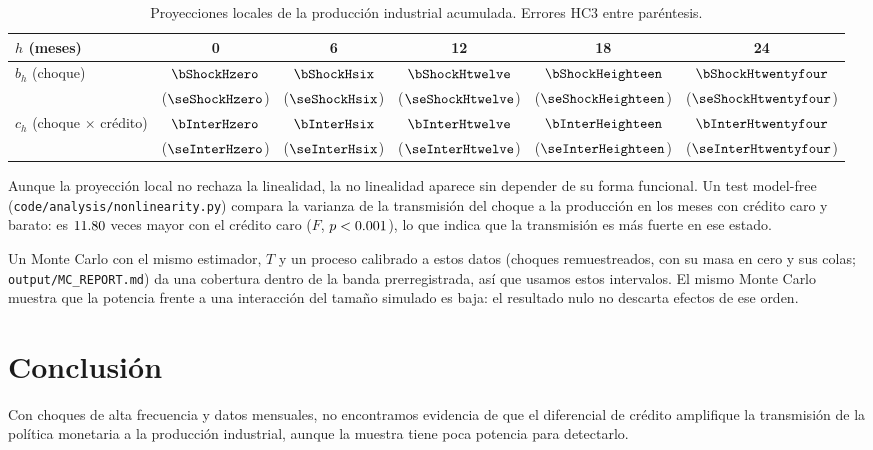 \documentclass[11pt]{article}
\begin{document}
\begin{table}[h]
\centering
\begin{tabular}{lccccc}
\toprule
$h$ (meses) & 0 & 6 & 12 & 18 & 24 \\
\midrule
$b_h$ (choque) & $\bShockHzero$ & $\bShockHsix$ & $\bShockHtwelve$ & $\bShockHeighteen$ & $\bShockHtwentyfour$ \\
 & ($\seShockHzero$) & ($\seShockHsix$) & ($\seShockHtwelve$) & ($\seShockHeighteen$) & ($\seShockHtwentyfour$) \\
$c_h$ (choque $\times$ crédito) & $\bInterHzero$ & $\bInterHsix$ & $\bInterHtwelve$ & $\bInterHeighteen$ & $\bInterHtwentyfour$ \\
 & ($\seInterHzero$) & ($\seInterHsix$) & ($\seInterHtwelve$) & ($\seInterHeighteen$) & ($\seInterHtwentyfour$) \\
\bottomrule
\end{tabular}
\caption{Proyecciones locales de la producción industrial acumulada. Errores HC3 entre paréntesis.}
\end{table}

Aunque la proyección local no rechaza la linealidad, la no linealidad aparece sin depender de su forma funcional.
Un test model-free (\texttt{code/analysis/nonlinearity.py}) compara la varianza de la transmisión del choque a la
producción en los meses con crédito caro y barato: es $11.80$ veces mayor con el crédito caro ($F$, $p < 0.001$), lo
que indica que la transmisión es más fuerte en ese estado.

Un Monte Carlo con el mismo estimador, $T$ y un proceso calibrado a estos datos (choques remuestreados, con su masa en
cero y sus colas; \texttt{output/MC\_REPORT.md}) da una cobertura dentro de la banda prerregistrada, así que usamos estos
intervalos. El mismo Monte Carlo muestra que la potencia frente a una interacción del tamaño simulado es baja: el
resultado nulo no descarta efectos de ese orden.

\section{Conclusión}
Con choques de alta frecuencia y datos mensuales, no encontramos evidencia de que el diferencial de crédito amplifique la
transmisión de la política monetaria a la producción industrial, aunque la muestra tiene poca potencia para detectarlo.
\end{document}
